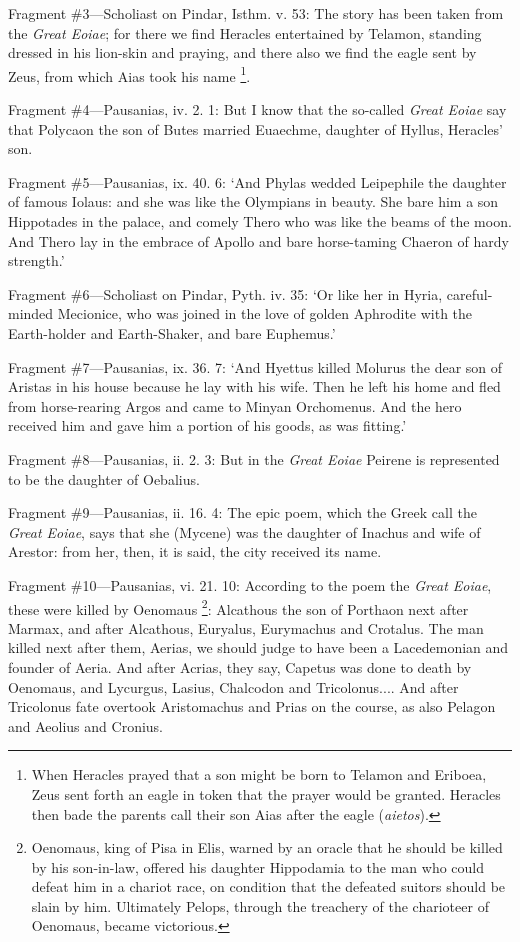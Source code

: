 Fragment \#3—Scholiast on Pindar, Isthm. v. 53: The story has been taken
from the \emph{Great Eoiae}; for there we find Heracles entertained by
Telamon, standing dressed in his lion-skin and praying, and there also we find
the eagle sent by Zeus, from which Aias took his name \footnote{When Heracles prayed that
a son might be born to Telamon and Eriboea, Zeus sent forth an eagle in token
that the prayer would be granted. Heracles then bade the parents call their son
Aias after the eagle (\emph{aietos}).}.

Fragment \#4—Pausanias, iv. 2. 1: But I know that the so-called
\emph{Great Eoiae} say that Polycaon the son of Butes married Euaechme,
daughter of Hyllus, Heracles’ son.

Fragment \#5—Pausanias, ix. 40. 6: ‘And Phylas wedded Leipephile the
daughter of famous Iolaus: and she was like the Olympians in beauty. She bare
him a son Hippotades in the palace, and comely Thero who was like the beams of
the moon. And Thero lay in the embrace of Apollo and bare horse-taming Chaeron
of hardy strength.’

Fragment \#6—Scholiast on Pindar, Pyth. iv. 35: ‘Or like her in
Hyria, careful-minded Mecionice, who was joined in the love of golden Aphrodite
with the Earth-holder and Earth-Shaker, and bare Euphemus.’

Fragment \#7—Pausanias, ix. 36. 7: ‘And Hyettus killed Molurus the
dear son of Aristas in his house because he lay with his wife. Then he left his
home and fled from horse-rearing Argos and came to Minyan Orchomenus. And the
hero received him and gave him a portion of his goods, as was fitting.’

Fragment \#8—Pausanias, ii. 2. 3: But in the \emph{Great Eoiae}
Peirene is represented to be the daughter of Oebalius.

Fragment \#9—Pausanias, ii. 16. 4: The epic poem, which the Greek call the
\emph{Great Eoiae}, says that she (Mycene) was the daughter of Inachus
and wife of Arestor: from her, then, it is said, the city received its name.

Fragment \#10—Pausanias, vi. 21. 10: According to the poem the
\emph{Great Eoiae}, these were killed by Oenomaus \footnote{Oenomaus, king of Pisa in
Elis, warned by an oracle that he should be killed by his son-in-law, offered
his daughter Hippodamia to the man who could defeat him in a chariot race, on
condition that the defeated suitors should be slain by him. Ultimately Pelops,
through the treachery of the charioteer of Oenomaus, became victorious.}: Alcathous the son of Porthaon
next after Marmax, and after Alcathous, Euryalus, Eurymachus and Crotalus. The
man killed next after them, Aerias, we should judge to have been a Lacedemonian
and founder of Aeria. And after Acrias, they say, Capetus was done to death by
Oenomaus, and Lycurgus, Lasius, Chalcodon and Tricolonus.... And after
Tricolonus fate overtook Aristomachus and Prias on the course, as also Pelagon
and Aeolius and Cronius.

